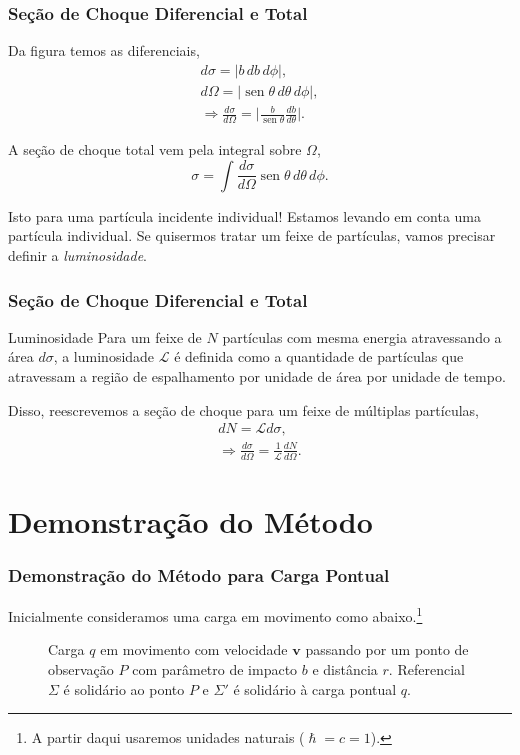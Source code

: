 \documentclass[xcolor=dvipsnames]{beamer}
\DeclareMathOperator*{\sen}{sen}
\renewcommand{\vec}{\mathbf}
\begin{document}
\begin{frame}
	\frametitle{Seção de Choque Diferencial e Total}
	Da figura temos as diferenciais,
	\begin{gather}
		d\sigma = |b\, db\, d\phi|,\\
		d\Omega = |\sen \theta \, d\theta \, d\phi|, \\ \Rightarrow
		\frac{d\sigma}{d\Omega} = \bigg| \frac{b}{\sen \theta}
		\frac{db}{d\theta} \bigg|. \label{diff_cross_section}
	\end{gather}

	A seção de choque total vem pela integral sobre $\Omega$,
	\begin{equation}
		\sigma = \int \frac{d\sigma}{d\Omega} \sen \theta \, d\theta \, d\phi .
	\end{equation}
	\begin{block}{Isto para uma partícula incidente individual!}
		Estamos levando em conta uma partícula individual. Se quisermos tratar
		um feixe de partículas, vamos precisar definir a \textit{luminosidade}.
	\end{block}

\end{frame}

\begin{frame}
	\frametitle{Seção de Choque Diferencial e Total}
	\begin{block}{Luminosidade}
		Para um feixe de $N$ partículas com mesma energia atravessando a área
		$d\sigma$, a luminosidade $\mathcal{L}$ é definida como a quantidade
		de partículas que atravessam a região de espalhamento por unidade de
		área por unidade de tempo.
	\end{block}
	Disso, reescrevemos a seção de choque para um feixe de múltiplas partículas,
	\begin{gather}
		dN = \mathcal{L} d\sigma, \\
		\Rightarrow \frac{d\sigma}{d\Omega} = \frac{1}{\mathcal{L}}
		\frac{dN}{d\Omega}.
	\end{gather}
\end{frame}

\section{Demonstração do Método}
\begin{frame}
	\frametitle{Demonstração do Método para Carga Pontual}
	Inicialmente consideramos uma carga em movimento como abaixo.\footnote{A
	partir daqui usaremos unidades naturais ($\hslash = c = 1$).}
	\begin{figure}
	
	\caption{Carga $q$ em movimento com velocidade $\vec{v}$ passando por um
		ponto de observação $P$ com parâmetro de impacto $b$ e distância $r$.
		Referencial $\Sigma$ é solidário ao ponto $P$ e $\Sigma '$ é solidário
		à carga pontual $q$.}
	\end{figure}
\end{frame}
\end{document}
